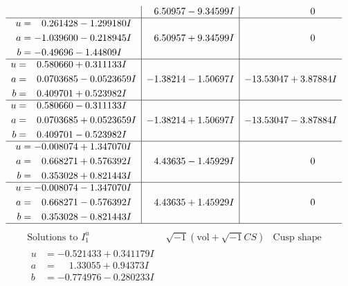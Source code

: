 \documentclass[1p]{elsarticle_modified}
\theoremstyle{definition}
\newcommand{\I}{\sqrt{-1}}
\begin{document}
$$\begin{array}{c|c|c}
 & \phantom{-}6.50957 - 9.34599 I & \phantom{-0.000000 } 0 \\ \hline\begin{aligned}
u &= \phantom{-}0.261428 - 1.299180 I \\
a &= -1.039600 - 0.218945 I \\
b &= -0.49696 - 1.44809 I\end{aligned}
 & \phantom{-}6.50957 + 9.34599 I & \phantom{-0.000000 } 0 \\ \hline\begin{aligned}
u &= \phantom{-}0.580660 + 0.311133 I \\
a &= \phantom{-}0.0703685 - 0.0523659 I \\
b &= \phantom{-}0.409701 + 0.523982 I\end{aligned}
 & -1.38214 - 1.50697 I & -13.53047 + 3.87884 I \\ \hline\begin{aligned}
u &= \phantom{-}0.580660 - 0.311133 I \\
a &= \phantom{-}0.0703685 + 0.0523659 I \\
b &= \phantom{-}0.409701 - 0.523982 I\end{aligned}
 & -1.38214 + 1.50697 I & -13.53047 - 3.87884 I \\ \hline\begin{aligned}
u &= -0.008074 + 1.347070 I \\
a &= \phantom{-}0.668271 + 0.576392 I \\
b &= \phantom{-}0.353028 + 0.821443 I\end{aligned}
 & \phantom{-}4.43635 - 1.45929 I & \phantom{-0.000000 } 0 \\ \hline\begin{aligned}
u &= -0.008074 - 1.347070 I \\
a &= \phantom{-}0.668271 - 0.576392 I \\
b &= \phantom{-}0.353028 - 0.821443 I\end{aligned}
 & \phantom{-}4.43635 + 1.45929 I & \phantom{-0.000000 } 0\\
 \hline 
 \end{array}$$\newpage$$\begin{array}{c|c|c}  
\text{Solutions to }I^u_{1}& \I (\text{vol} + \sqrt{-1}CS) & \text{Cusp shape}\\
 \hline 
\begin{aligned}
u &= -0.521433 + 0.341179 I \\
a &= \phantom{-}1.33055 + 0.94373 I \\
b &= -0.774976 - 0.280233 I\end{aligned}

\end{array}$$
\end{document}
